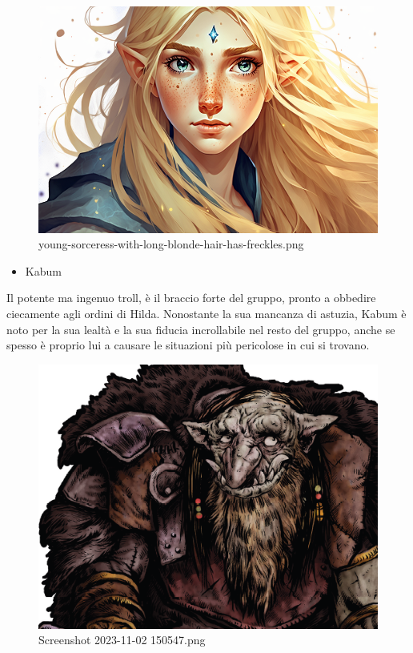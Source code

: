 \begin{figure}
\centering
\includegraphics{young-sorceress-with-long-blonde-hair-has-freckles.png}
\caption{young-sorceress-with-long-blonde-hair-has-freckles.png}
\end{figure}

\begin{itemize}
\tightlist
\item
  Kabum
\end{itemize}

Il potente ma ingenuo troll, è il braccio forte del gruppo, pronto a
obbedire ciecamente agli ordini di Hilda. Nonostante la sua mancanza di
astuzia, Kabum è noto per la sua lealtà e la sua fiducia incrollabile
nel resto del gruppo, anche se spesso è proprio lui a causare le
situazioni più pericolose in cui si trovano.

\begin{figure}
\centering
\includegraphics{Screenshot_2023-11-02_150547.png}
\caption{Screenshot 2023-11-02 150547.png}
\end{figure}

